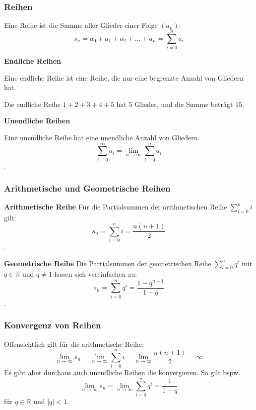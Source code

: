 \documentclass{beamer}
\begin{document}
  \begin{frame}
    \frametitle{Reihen}
    
    Eine Reihe ist die Summe aller Glieder einer Folge $(a_n)$:
    $$s_n = a_0 + a_1 + a_2 + \ldots + a_n = \sum_{i=0}^{n} a_i$$
  
    \vspace{0.5em}
  
    \textbf{Endliche Reihen}
  
    Eine endliche Reihe ist eine Reihe, die nur eine begrenzte Anzahl von Gliedern hat. 
  
    Die endliche Reihe $1 + 2 + 3 + 4 + 5$ hat 5 Glieder, und die Summe beträgt $15$.
  
    \vspace{0.5em}
  
    \textbf{Unendliche Reihen}
  
    Eine unendliche Reihe hat eine unendliche Anzahl von Gliedern. 
    $$\sum_{i=0}^{\infty} a_i = \lim_{n \to \infty} \sum_{i=0}^{n} a_i$$.
\end{frame}

\begin{frame}
  \frametitle{Arithmetische und Geometrische Reihen}
    \textbf{Arithmetische Reihe}
    Für die Partialsummen der arithmetischen Reihe $\sum_{i=0}^{n} i $ gilt:
    $$ s_n = \sum_{i=0}^{n} i = \frac{n(n+1)}{2}$$.

    \textbf{Geometrische Reihe}
    Die Partialsummen der geometrischen Reihe $\sum_{i=0}^{n} q^i $ mit $q \in\mathbb{R}$ und $q \neq 1$ lassen sich vereinfachen zu:
    $$ s_n = \sum_{i=0}^{n} q^i = \frac{1-q^{n+1}}{1 - q }$$.

\end{frame}

\begin{frame}
  \frametitle{Konvergenz von Reihen}
  Offensichtlich gilt für die arithmetische Reihe:
  $$ \lim_{n \to \infty} s_n = \lim_{n \to \infty}  \sum_{i=0}^{n} i = \lim_{n \to \infty}  \frac{n(n+1)}{2} =\infty$$
  Es gibt aber durchaus auch unendliche Reihen die konvergieren. So gilt bspw.
  $$\lim_{n \to \infty}  s_n =\lim_{n \to \infty}  \sum_{i=0}^{n} q^i = \frac{1}{1 - q }$$
  für $q \in \mathbb{R}$ und $\vert q\vert   < 1$.
  \end{frame}
  
\end{document}
